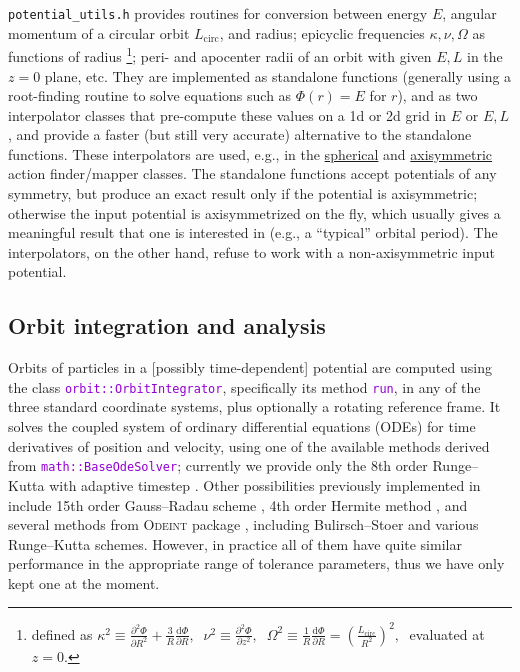 \documentclass[12pt]{article}
\newcommand{\ttt}[1]{\textcolor{darkviolet}{\texttt{#1}}}
\renewcommand{\d}{\mathrm{d}}
\newcommand{\D}{\partial}
\begin{document}
\texttt{potential_utils.h} provides routines for conversion between energy $E$, angular momentum of a circular orbit $L_\mathrm{circ}$, and radius; epicyclic frequencies $\kappa,\nu,\Omega$ as functions of radius%
\footnote{defined as $\displaystyle \kappa^2\equiv \frac{\D ^2\Phi}{\D R^2} + \frac 3 R \frac{\d\Phi}{\D R},\;\; \nu^2\equiv \frac{\D ^2\Phi}{\D z^2},\;\; \Omega^2\equiv \frac 1 R \frac{\d\Phi}{\D R} = \left(\frac{L_\mathrm{circ}}{R^2}\right)^2,\;$ evaluated at $z=0$.};
peri- and apocenter radii of an orbit with given $E,L$ in the $z=0$ plane, etc. They are implemented as standalone functions (generally using a root-finding routine to solve equations such as $\Phi(r)=E$ for $r$), and as two interpolator classes that pre-compute these values on a 1d or 2d grid in $E$ or $E,L$, and provide a faster (but still very accurate) alternative to the standalone functions. These interpolators are used, e.g., in the \hyperref[sec:ActionsSpherical]{spherical} and \hyperref[sec:ActionsStaeckel]{axisymmetric} action finder/mapper classes. The standalone functions accept potentials of any symmetry, but produce an exact result only if the potential is axisymmetric; otherwise the input potential is axisymmetrized on the fly, which usually gives a meaningful result that one is interested in (e.g., a ``typical'' orbital period). The interpolators, on the other hand, refuse to work with a non-axisymmetric input potential.


\subsection{Orbit integration and analysis}  \label{sec:Orbits}

Orbits of particles in a [possibly time-dependent] potential are computed using the class  \ttt{orbit::OrbitIntegrator}, specifically its method \ttt{run}, in any of the three standard coordinate systems, plus optionally a rotating reference frame. It solves the coupled system of ordinary differential equations (ODEs) for time derivatives of position and velocity, using one of the available methods derived from \ttt{math::BaseOdeSolver}; currently we provide only the 8th order Runge--Kutta with adaptive timestep \cite{DOP853}. Other possibilities previously implemented in \cite{Vasiliev2013} include 15th order Gauss--Radau scheme \cite{IAS15}, 4th order Hermite method \cite{Hermite}, and several methods from \textsc{Odeint} package \cite{odeint}, including Bulirsch--Stoer and various Runge--Kutta schemes. However, in practice all of them have quite similar performance in the appropriate range of tolerance parameters, thus we have only kept one at the moment.
\end{document}
